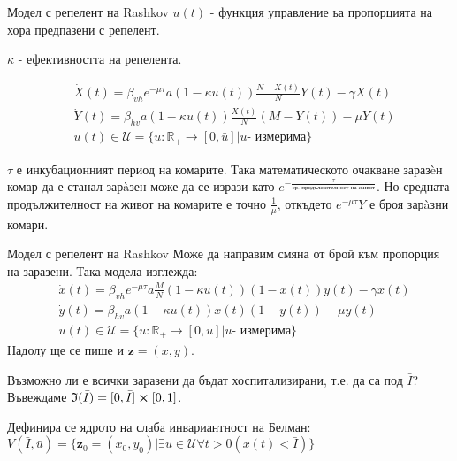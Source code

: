 
\begin{frame}[t]{Модел с репелент на Rashkov}
  $u(t)$ - функция управление ьа пропорцията на хора предпазени с репелент.

  $\kappa$ - ефективността на репелента.

  \begin{equation}
    \label{eq:RepellentProblem}
    \begin{split}
      &\dot{X}(t) = \beta_{vh} e^{-\mu \tau} a (1-\kappa u(t)) \frac{N-X(t)}{N} Y(t) - \gamma X(t) \\
      &\dot{Y}(t) = \beta_{hv} a (1-\kappa u(t)) \frac{X(t)}{N} (M-Y(t)) - \mu Y(t) \\
      &u(t) \in \mathscr{U} = \{u:\mathbb{R}_+ \rightarrow [0, \bar{u}] \vert u \text{- измерима}\}
    \end{split}
  \end{equation}

  $\tau$ е инкубационният период на комарите. Така математическото очакване заразèн комар да е станал зарàзен може да се изрази като $e^{-\frac{\tau}{\text{ср. продължителност на живот}}}$. Но средната продължителност на живот на комарите е точно $\frac{1}{\mu}$, откъдето $e^{-\mu\tau}Y$ е броя зарàзни комари.
\end{frame}

\begin{frame}[t]{Модел с репелент на Rashkov}
  Може да направим смяна от брой към пропорция на заразени. Така модела изглежда:
  \begin{equation}
    \begin{split}
      &\dot{x}(t) = \beta_{vh} e^{-\mu \tau} a \frac{M}{N} (1-\kappa u(t)) (1 - x(t)) y(t) - \gamma x(t) \\
      &\dot{y}(t) = \beta_{hv} a (1-\kappa u(t)) x(t) (1 - y(t)) - \mu y(t) \\
      &u(t) \in \mathscr{U} = \{u:\mathbb{R}_+ \rightarrow [0, \bar{u}] \vert u \text{- измерима}\}
    \end{split}
  \end{equation}
  Надолу ще се пише и $\boldsymbol{z}=(x,y)$.

  Възможно ли е всички заразени да бъдат хоспитализирани, т.е. да са под $\bar{I}$?
  Въвеждаме $\mathfrak{I}(\bar{I}) = [0, \bar{I}] \cross [0, 1]$.

  Дефинира се ядрото на слаба инвариантност на Белман:
  $V(\bar{I}, \bar{u}) = \{\boldsymbol{z}_0=(x_0, y_0) \vert \exists{u \in \mathscr{U}}\forall t>0 \left(x(t) < \bar{I}\right)\}$
\end{frame}

